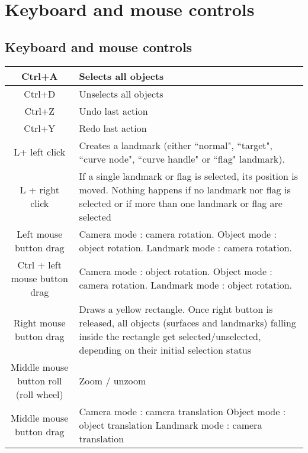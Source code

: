 \chapter{Keyboard and mouse controls}
\minitoc  

 \section{Keyboard and mouse controls}
\begin{tabularx}{\linewidth}{ | c | X | }
 \hline			
   Ctrl+A & Selects all objects \\ \hline				
   Ctrl+D & Unselects all objects \\ \hline				
	 Ctrl+Z & Undo last action \\ \hline				
	Ctrl+Y & Redo last action \\ \hline				
   L+ left click & Creates a landmark (either ``normal", ``target", ``curve node", ``curve handle" or ``flag" landmark). \\ \hline			
L + right click & If a single landmark or flag is selected, its position is
moved. Nothing happens if no landmark nor flag is selected
or if more than one landmark or flag are selected \\ \hline			

Left mouse button drag 
& Camera mode : camera rotation.\newline
 Object mode : object rotation.\newline
Landmark mode : camera rotation. \\ \hline			

Ctrl + left mouse button drag 
& Camera mode : object rotation.\newline
 Object mode : camera rotation.\newline
 Landmark mode : object rotation. \\ \hline	
		
Right mouse button drag & Draws a yellow rectangle. Once right button is
released, all objects (surfaces and landmarks)
falling inside the rectangle get selected/unselected,
depending on their initial selection status \\ \hline	
		

Middle mouse button roll (roll wheel) & Zoom / unzoom \\ \hline		
	
Middle mouse button drag 
& Camera mode : camera translation\newline
 Object mode : object translation\newline
 Landmark mode : camera translation \\ \hline	
		

\end{tabularx}
